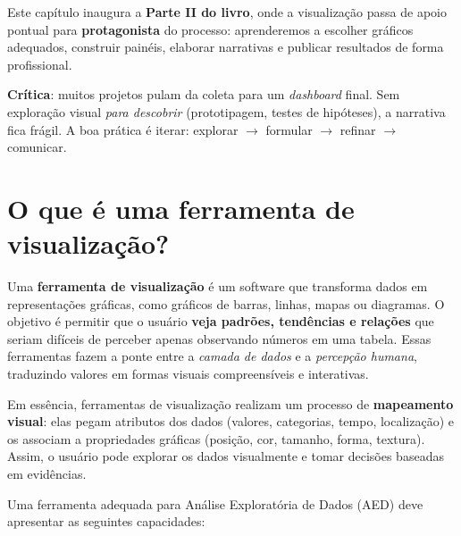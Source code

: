 Este capítulo inaugura a \textbf{Parte II do livro}, onde a visualização passa de apoio pontual para \textbf{protagonista} do processo: aprenderemos a escolher gráficos adequados, construir painéis, elaborar narrativas e publicar resultados de forma profissional.




\begin{NoteBox}
\textbf{Crítica}: muitos projetos pulam da coleta para um \textit{dashboard} final. 
Sem exploração visual \textit{para descobrir} (prototipagem, testes de hipóteses), a narrativa fica frágil. 
A boa prática é iterar: explorar \(\rightarrow\) formular \(\rightarrow\) refinar \(\rightarrow\) comunicar.
\end{NoteBox}

\section{O que é uma ferramenta de visualização?}

Uma \textbf{ferramenta de visualização} é um software que transforma dados em representações gráficas, como gráficos de barras, linhas, mapas ou diagramas. O objetivo é permitir que o usuário \textbf{veja padrões, tendências e relações} que seriam difíceis de perceber apenas observando números em uma tabela. Essas ferramentas fazem a ponte entre a \textit{camada de dados} e a \textit{percepção humana}, traduzindo valores em formas visuais compreensíveis e interativas.

Em essência, ferramentas de visualização realizam um processo de \textbf{mapeamento visual}: elas pegam atributos dos dados (valores, categorias, tempo, localização) e os associam a propriedades gráficas (posição, cor, tamanho, forma, textura). Assim, o usuário pode explorar os dados visualmente e tomar decisões baseadas em evidências.

Uma ferramenta adequada para Análise Exploratória de Dados (AED) deve apresentar as seguintes capacidades:

